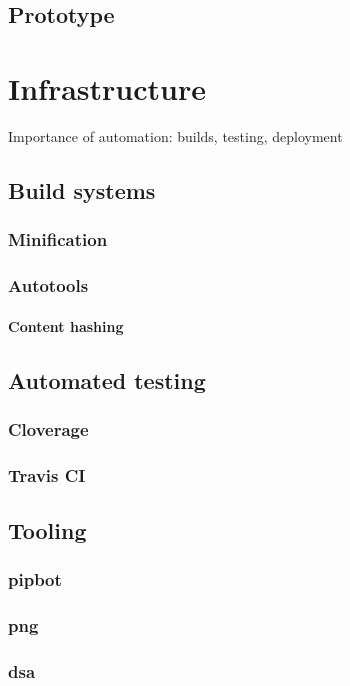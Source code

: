 \documentclass[12pt]{report}
\begin{document}
\section{Prototype}


\chapter{Infrastructure}
Importance of automation: builds, testing, deployment

\section{Build systems}
\subsection{Minification}
\subsection{Autotools}
\subsubsection{Content hashing}

\section{Automated testing}
\subsection{Cloverage}
\subsection{Travis CI}

\section{Tooling}
\subsection{pipbot}
\subsection{png}
\subsection{dsa}
\end{document}
